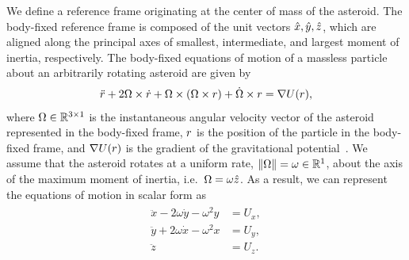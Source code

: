 We define a reference frame originating at the center of mass of the asteroid.
The body-fixed reference frame is composed of the unit vectors \( \hat{x} , \hat{y}, \hat{z} \), which are aligned along the principal axes of smallest, intermediate, and largest moment of inertia, respectively.
The body-fixed equations of motion of a massless particle about an arbitrarily rotating asteroid are given by
\begin{align}\label{eq:body_eoms}
    \ddot{r} + 2 \Omega \times \dot{r} + \Omega \times \left(  \Omega \times r  \right) + \dot{\Omega} \times r = \nabla U(r) ,
\end{align}
where \( \Omega \in \mathbb{R}^{3 \times 1}\) is the instantaneous angular velocity vector of the asteroid represented in the body-fixed frame, \( r \) is the position of the particle in the body-fixed frame, and \( \nabla U(r) \) is the gradient of the gravitational potential~\cite{scheeres2012a}.
We assume that the asteroid rotates at a uniform rate, \( \left\| \Omega \right\| = \omega \in \mathbb{R}^1 \), about the axis of the maximum moment of inertia, i.e.\ \( \Omega = \omega \hat{z }\).
As a result, we can represent the equations of motion in scalar form as
\begin{align} \label{eq:eoms}
    \begin{split}
        \ddot{x} - 2 \omega \dot{y} - \omega^2 y &= U_x , \\
        \ddot{y} + 2 \omega \dot{x} - \omega^2 x &= U_y , \\
        \ddot{z} &= U_z .
    \end{split}
\end{align}


